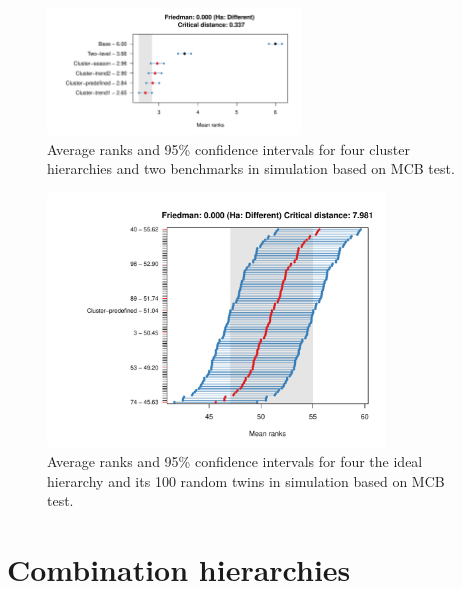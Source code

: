 \documentclass[a4paper,review,12pt,authoryear]{elsarticle}
\begin{document}
\begin{figure}
    \centering
    \includegraphics[width=0.6\textwidth]{figures/hierarchy_rmsse/simulation/P3_mcb.pdf}
    \caption{\label{fig:simu_P3_benchmarks}Average ranks and 95\% confidence intervals for four cluster hierarchies and two benchmarks in simulation based on MCB test.}
\end{figure}

\begin{figure}
    \centering
    \includegraphics[width=0.8\textwidth]{figures/hierarchy_rmsse/simulation/P3_c_vs_pc.pdf}
    \caption{Average ranks and 95\% confidence intervals for four the ideal hierarchy and its 100 random twins in simulation based on MCB test.}
    \label{fig:simu_P3_c_vs_pc}
\end{figure}



\section{Combination hierarchies}
\label{sec:combination}
\end{document}
